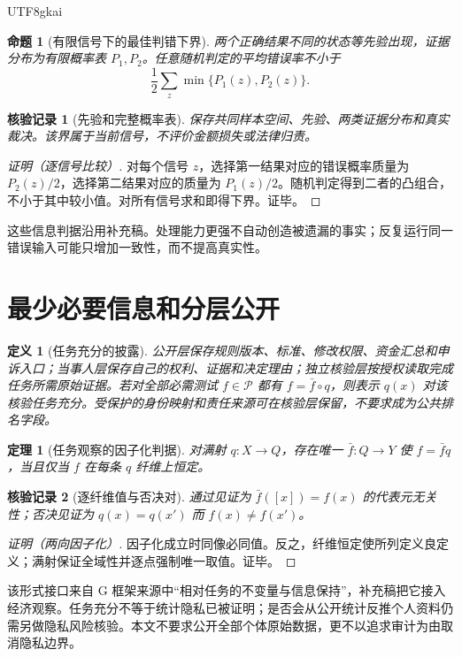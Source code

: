 \documentclass[12pt,a4paper,openany]{report}
\newtheorem{definition}{定义}[chapter]
\newtheorem{theorem}{定理}[chapter]
\newtheorem{proposition}{命题}[chapter]
\newtheorem{Certificate}{核验记录}[chapter]
\begin{document}
\begin{CJK*}{UTF8}{gkai}
\begin{proposition}[有限信号下的最佳判错下界]
\label{prop:bayes-error}
两个正确结果不同的状态等先验出现，证据分布为有限概率表 $P_1,P_2$。任意随机判定的平均错误率不小于
\[
 \frac12\sum_z\min\{P_1(z),P_2(z)\}.
\]
\end{proposition}
\begin{Certificate}[先验和完整概率表]
保存共同样本空间、先验、两类证据分布和真实裁决。该界属于当前信号，不评价金额损失或法律归责。
\end{Certificate}
\begin{proof}[证明（逐信号比较）]
对每个信号 $z$，选择第一结果对应的错误概率质量为 $P_2(z)/2$，选择第二结果对应的质量为 $P_1(z)/2$。随机判定得到二者的凸组合，不小于其中较小值。对所有信号求和即得下界。证毕。
\end{proof}
这些信息判据沿用补充稿\cite{SourceSupplement}。处理能力更强不自动创造被遗漏的事实；反复运行同一错误输入可能只增加一致性，而不提高真实性。

\section{最少必要信息和分层公开}
\begin{definition}[任务充分的披露]
\label{def:disclosure}
公开层保存规则版本、标准、修改权限、资金汇总和申诉入口；当事人层保存自己的权利、证据和决定理由；独立核验层按授权读取完成任务所需原始证据。若对全部必需测试 $f\in\mathcal P$ 都有 $f=\bar f\circ q$，则表示 $q(x)$ 对该核验任务充分。受保护的身份映射和责任来源可在核验层保留，不要求成为公共排名字段。
\end{definition}

\begin{theorem}[任务观察的因子化判据]
\label{thm:factorization}
对满射 $q:X\to Q$，存在唯一 $\bar f:Q\to Y$ 使 $f=\bar f q$，当且仅当 $f$ 在每条 $q$ 纤维上恒定。
\end{theorem}
\begin{Certificate}[逐纤维值与否决对]
通过见证为 $\bar f([x])=f(x)$ 的代表元无关性；否决见证为 $q(x)=q(x')$ 而 $f(x)\ne f(x')$。
\end{Certificate}
\begin{proof}[证明（两向因子化）]
因子化成立时同像必同值。反之，纤维恒定使所列定义良定义；满射保证全域性并逐点强制唯一取值。证毕。
\end{proof}
该形式接口来自 G 框架来源中“相对任务的不变量与信息保持”，补充稿把它接入经济观察\cite{SourceG,SourceSupplement}。任务充分不等于统计隐私已被证明；是否会从公开统计反推个人资料仍需另做隐私风险核验。本文不要求公开全部个体原始数据，更不以追求审计为由取消隐私边界。

\end{CJK*}
\end{document}
